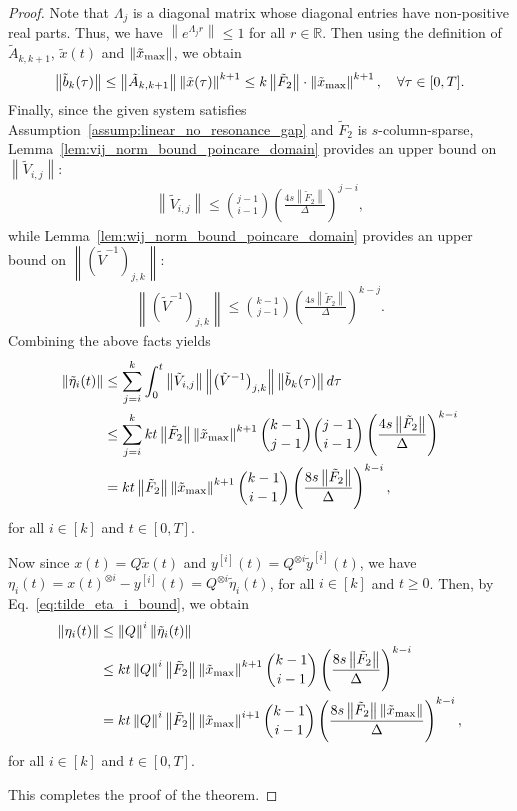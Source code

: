 \documentclass[superscriptaddress,onecolumn,nofootinbib,longbibliography,a4paper,accepted=2026-09-29]{quantumarticle}
\theoremstyle{plain}
\theoremstyle{definition}
\numberwithin{thm}{section}
\numberwithin{assumption}{section}
\numberwithin{lemma}{section}
\numberwithin{prop}{section}
\numberwithin{cor}{section}
\numberwithin{definition}{section}
\numberwithin{rmk}{section}
\numberwithin{equation}{section}
\newcommand{\norm}[1]     {\left\| #1 \right\|}
\newcommand{\R}{\mathbb{R}}
\newcommand{\lrb}[1]{\left ( #1 \right )}
\begin{document}
\begin{proof}
Note that $\Lambda_j$ is a diagonal matrix whose diagonal entries have non-positive real parts. Thus, we have $\norm{e^{\Lambda_j r}} \le 1$ for all $r \in \R$. Then using the definition of $\tilde{A}_{k, k+1}$, $\tilde{x}(t)$ and $\norm{\tilde{x}_{\rm max}}$, we obtain 
\begin{align}
    \norm{\tilde{b}_k(\tau)} \le \norm{\tilde{A}_{k, k+1}} \norm{\tilde{x}(\tau)}^{k+1}
    \le k \norm{\tilde{F}_2} \cdot \norm{\tilde{x}_{\rm max}}^{k+1}, ~~~\forall \tau \in [0, T]. 
\end{align}
Finally, since the given system satisfies Assumption~\ref{assump:linear_no_resonance_gap} and $\tilde{F}_2$ is $s$-column-sparse, Lemma~\ref{lem:vij_norm_bound_poincare_domain} provides an upper bound on $\norm{\tilde{V}_{i,j}}$:
\begin{align}
   \norm{\tilde{V}_{i,j}} \le \binom{j-1}{i-1} \lrb{\frac{4s\norm{\tilde{F}_2}}{\Delta}}^{j-i},
\end{align}
while Lemma~\ref{lem:wij_norm_bound_poincare_domain} provides an upper bound on $\norm{\lrb{\tilde{V}^{-1}}_{j,k}}$:
\begin{align}
    \norm{\lrb{\tilde{V}^{-1}}_{j,k}} \le \binom{k-1}{j-1}\lrb{\frac{4s\norm{\tilde{F}_2}}{\Delta}}^{k-j}.
\end{align}
Combining the above facts yields
\begin{align}
\norm{\tilde{\eta}_i(t)} &\le \sum_{j=i}^k \int_0^t \norm{\tilde{V}_{i,j}} \norm{\lrb{\tilde{V}^{-1}}_{j,k}} \norm{\tilde{b}_k(\tau)} 
d\tau \\
& \le \sum_{j=i}^k k t \norm{\tilde{F}_2} \norm{\tilde{x}_{\rm max}}^{k+1} 
    \binom{k-1}{j-1}\binom{j-1}{i-1}\lrb{\frac{4s\norm{\tilde{F}_2}}{\Delta}}^{k-i} \\
    & = k t \norm{\tilde{F}_2} \norm{\tilde{x}_{\rm max}}^{k+1} \binom{k-1}{i-1} \lrb{\frac{8 s\norm{\tilde{F}_2}}{\Delta}}^{k-i},
    \label{eq:tilde_eta_i_bound}
\end{align}
for all $i \in [k]$ and $t \in [0, T]$.

Now since $x(t)=Q\tilde{x}(t)$ and $y^{[i]}(t)=Q^{\otimes i} \tilde{y}^{[i]}(t)$, we have ${\eta}_i(t)={x}(t)^{\otimes i}-{y}^{[i]}(t)
=Q^{\otimes i} \tilde{\eta}_i(t)$, for all $i \in [k]$ and $t \ge 0$. Then, by Eq.~\eqref{eq:tilde_eta_i_bound}, we obtain
\begin{align}
\norm{\eta_i(t)}
&\le \norm{Q}^{i} \norm{\tilde{\eta}_i(t)} \\
&\le 
k t \norm{Q}^{i}\norm{\tilde{F}_2} \norm{\tilde{x}_{\rm max}}^{k+1} \binom{k-1}{i-1} \lrb{\frac{8 s\norm{\tilde{F}_2}}{\Delta}}^{k-i}\\
&= k t  \norm{Q}^i\norm{\tilde{F}_2} \norm{\tilde{x}_{\rm max}}^{i+1}\binom{k-1}{i-1} \lrb{\frac{8 s \norm{\tilde{F}_2}\norm{\tilde{x}_{\rm max}}}{\Delta}}^{k-i},
\end{align}
for all $i \in [k]$ and $t \in [0, T]$.

This completes the proof of the theorem.
\end{proof}
\end{document}
